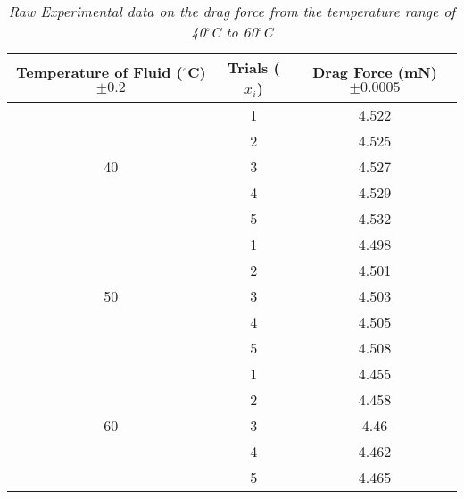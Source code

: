 \begin{table}[htbp]
  \centering
  \caption{\textit{Raw Experimental data on the drag force from the temperature range of 40$^\circ$C to 60$^\circ$C}}
    \begin{tabular}{ccc}
    \toprule
    Temperature of Fluid ($^\circ$C) $\pm 0.2$ & Trials ($x_i$) & Drag Force (mN) $\pm 0.0005$ \\
    \midrule
    \multirow{5}[10]{*}{40} & 1     & 4.522 \\
\cmidrule{2-3}          & 2     & 4.525 \\
\cmidrule{2-3}          & 3     & 4.527 \\
\cmidrule{2-3}          & 4     & 4.529 \\
\cmidrule{2-3}          & 5     & 4.532 \\
    \midrule
    \multirow{5}[10]{*}{50} & 1     & 4.498 \\
\cmidrule{2-3}          & 2     & 4.501 \\
\cmidrule{2-3}          & 3     & 4.503 \\
\cmidrule{2-3}          & 4     & 4.505 \\
\cmidrule{2-3}          & 5     & 4.508 \\
    \midrule
    \multirow{5}[10]{*}{60} & 1     & 4.455 \\
\cmidrule{2-3}          & 2     & 4.458 \\
\cmidrule{2-3}          & 3     & 4.46 \\
\cmidrule{2-3}          & 4     & 4.462 \\
\cmidrule{2-3}          & 5     & 4.465 \\
    \bottomrule
    \end{tabular}%
  \label{tab:addlabel}%
\end{table}%

